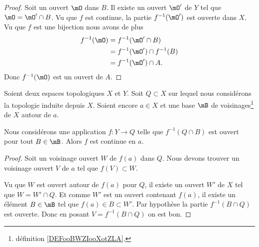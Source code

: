 \begin{proof}
	Soit un ouvert \( \mO\) dans \( B\). Il existe un ouvert \( \mO'\) de \( Y\) tel que \( \mO=\mO'\cap B\). Vu que \( f\) est continue, la partie \( f^{-1}(\mO')\) est ouverte dans \( X\). Vu que \( f\) est une bijection nous avons de plus
	\begin{subequations}
		\begin{align}
			f^{-1}(\mO) & =f^{-1}(\mO'\cap B)         \\
			            & =f^{-1}(\mO')\cap f^{-1}(B) \\
			            & =f^{-1}(\mO')\cap A.
		\end{align}
	\end{subequations}
	Donc \( f^{-1}(\mO)\) est un ouvert de \( A\).
\end{proof}


\begin{lemma}	\label{LEMooPONCooJbuBMl}
	Soient deux espaces topologiques \( X\) et \( Y\). Soit \( Q\subset X\) sur lequel nous considérons la topologie induite depuis \( X\). Soient encore \( a\in X\) et une base \( \mB\) de voisinages\footnote{définition \ref{DEFooBWZIooXotZLA}.} de \( X\) autour de \( a\).

	Nous considérons une application \(f \colon Y\to Q  \) telle que \( f^{-1}(Q\cap B)\) est ouvert pour tout \( B\in \mB\). Alors \( f\) est continue en \( a\).
\end{lemma}

\begin{proof}
	Soit un voisinage ouvert \( W\) de \( f(a)\) dans \( Q\). Nous devons trouver un voisinage ouvert \( V\) de \( a\) tel que \( f(V)\subset W\).

	Vu que \( W\) est ouvert autour de \( f(a)\) pour \( Q\), il existe un ouvert \( W'\) de \( X\) tel que \( W=W'\cap Q\). Et comme \( W'\) est un ouvert contenant \( f(a)\), il existe un élément \( B\in\mB\) tel que \( f(a)\in B\subset W'\). Par hypothèse la partie \( f^{-1}(B\cap Q)\) est ouverte. Donc en posant \( V=f^{-1}(B\cap Q)\) on est bon.
\end{proof}


